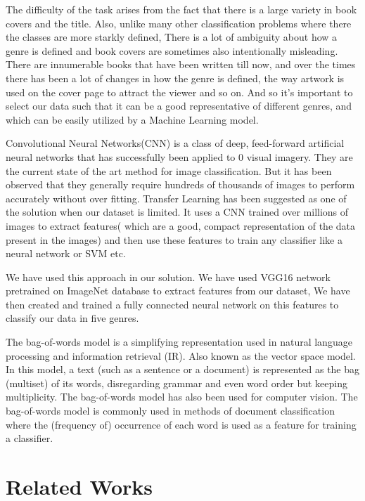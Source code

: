 \documentclass[conference]{IEEEtran}
\begin{document}
The difficulty of the task arises from the fact that there is a large variety in book covers and the title. Also, unlike many other classification problems where there the classes are more starkly defined, There is a lot of ambiguity about how a genre is defined and book covers are sometimes also intentionally misleading. There are innumerable books that have been written till now, and over the times there has been a lot of changes in how the genre is defined, the way artwork is used on the cover page to attract the viewer and so on. And so it’s important to select our data such that it can be a good representative of different genres, and which can be easily utilized by a Machine Learning model.

Convolutional Neural Networks(CNN) is a class of deep, feed-forward artificial neural networks that has successfully been applied to 0 visual imagery. They are the current state of the art method for image classification. But it has been observed that they generally require hundreds of thousands of images to perform accurately without over fitting. Transfer Learning has been suggested as one of the solution when our dataset is limited. It uses a CNN trained over millions of images to extract features( which are a good, compact representation of the data present in the images) and then use these features to train any classifier like a neural network or SVM etc.

We have used this approach in our solution. We have used VGG16\cite{b2} network pretrained on ImageNet database to extract features from our dataset, We have then created and trained a fully connected neural network on this features to classify our data in  five genres.

The bag-of-words model is a simplifying representation used in natural language processing and information retrieval (IR). Also known as the vector space model. In this model, a text (such as a sentence or a document) is represented as the bag (multiset) of its words, disregarding grammar and even word order but keeping multiplicity. The bag-of-words model has also been used for computer vision.
The bag-of-words model is commonly used in methods of document classification where the (frequency of) occurrence of each word is used as a feature for training a classifier.

\section{Related Works}
\end{document}
